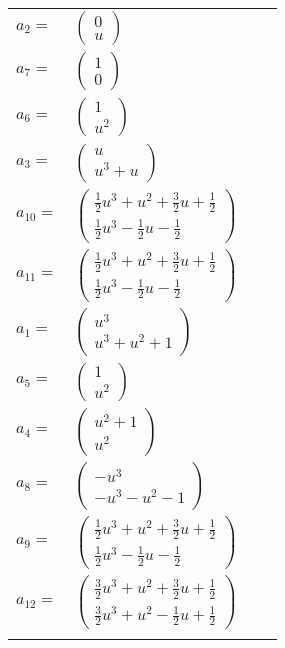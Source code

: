 \documentclass[1p]{elsarticle_modified}
\theoremstyle{definition}
\begin{document}
\begin{tabular}{m{7pt} m{180pt} m{7pt} m{180pt} }
\flushright $a_{2}=$&$\begin{pmatrix}0\\u\end{pmatrix}$ \\
\flushright $a_{7}=$&$\begin{pmatrix}1\\0\end{pmatrix}$ \\
\flushright $a_{6}=$&$\begin{pmatrix}1\\u^2\end{pmatrix}$ \\
\flushright $a_{3}=$&$\begin{pmatrix}u\\u^3+u\end{pmatrix}$ \\
\flushright $a_{10}=$&$\begin{pmatrix}\frac{1}{2} u^3+u^2+\frac{3}{2} u+\frac{1}{2}\\\frac{1}{2} u^3-\frac{1}{2} u-\frac{1}{2}\end{pmatrix}$ \\
\flushright $a_{11}=$&$\begin{pmatrix}\frac{1}{2} u^3+u^2+\frac{3}{2} u+\frac{1}{2}\\\frac{1}{2} u^3-\frac{1}{2} u-\frac{1}{2}\end{pmatrix}$ \\
\flushright $a_{1}=$&$\begin{pmatrix}u^3\\u^3+u^2+1\end{pmatrix}$ \\
\flushright $a_{5}=$&$\begin{pmatrix}1\\u^2\end{pmatrix}$ \\
\flushright $a_{4}=$&$\begin{pmatrix}u^2+1\\u^2\end{pmatrix}$ \\
\flushright $a_{8}=$&$\begin{pmatrix}- u^3\\- u^3- u^2-1\end{pmatrix}$ \\
\flushright $a_{9}=$&$\begin{pmatrix}\frac{1}{2} u^3+u^2+\frac{3}{2} u+\frac{1}{2}\\\frac{1}{2} u^3-\frac{1}{2} u-\frac{1}{2}\end{pmatrix}$ \\
\flushright $a_{12}=$&$\begin{pmatrix}\frac{3}{2} u^3+u^2+\frac{3}{2} u+\frac{1}{2}\\\frac{3}{2} u^3+u^2-\frac{1}{2} u+\frac{1}{2}\end{pmatrix}$\\&\end{tabular}
\end{document}
